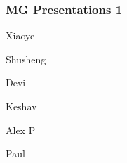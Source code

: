 \documentclass[t,12pt,numbers,fleqn]{beamer}
\begin{document}



\begin{frame}
\frametitle{MG Presentations 1}

\bi
\item Xiaoye
\item Shusheng
\item Devi
\item Keshav
\item Alex P
\item Paul
\ei
\end{frame}

\end{document}
